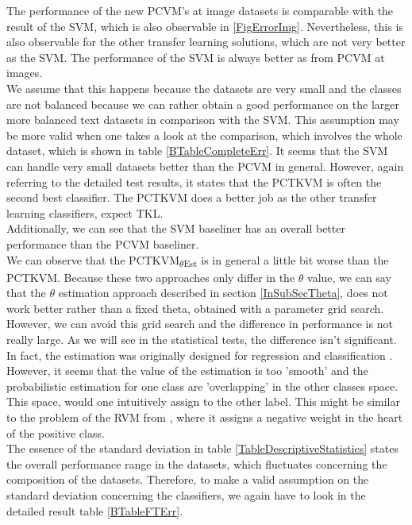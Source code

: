 \noindent
The performance of the new \acs{PCVM}'s at image datasets is comparable with the result of the \acs{SVM}, which is also observable in \ref{FigErrorImg}.
Nevertheless, this is also observable for the other transfer learning solutions, which are not very better as the \acs{SVM}.
The performance of the \acs{SVM} is always better as from \acs{PCVM} at images.\\
We assume that this happens because the datasets are very small and the classes are not balanced because we can rather obtain a good performance on the larger more balanced text datasets in comparison with the \acs{SVM}.
This assumption may be more valid when one takes a look at the comparison, which involves the whole dataset, which is shown in table \ref{BTableCompleteErr}.
It seems that the \acs{SVM} can handle very small datasets better than the \acs{PCVM} in general.
However, again referring to the detailed test results, it states that the \acs{PCTKVM} is often the second best classifier.
The \acs{PCTKVM} does a better job as the other transfer learning classifiers, expect \acs{TKL}.\\
Additionally, we can see that the \acs{SVM} baseliner has an overall better performance than the \acs{PCVM} baseliner.\\
We can observe that the \acs{PCTKVM}\textsubscript{$\theta$Est} is in general a little bit worse than the \acs{PCTKVM}. 
Because these two approaches only differ in the $\theta$ value, we can say that the $\theta$ estimation approach described in section \ref{InSubSecTheta}, does not work better rather than a fixed theta, obtained with a parameter grid search. However, we can avoid this grid search and the difference in performance is not really large. As we will see in the statistical tests, the difference isn't significant.
In fact, the estimation was originally designed for regression and classification \cite{Kitayama.2011}. However, it seems that the value of the estimation is too 'smooth' and the probabilistic estimation for one class are 'overlapping' in the other classes space.
This space, would one intuitively assign to the other label.
This might be similar to the problem of the \acs{RVM} from \cite{Chen.2009}, where it assigns a negative weight in the heart of the positive class.\\
The essence of the standard deviation in table \ref{TableDescriptiveStatistics} states the overall performance range in the datasets, which fluctuates concerning the composition of the datasets.
Therefore, to make a valid assumption on the standard deviation concerning the classifiers, we again have to look in the detailed result table \ref{BTableFTErr}.
